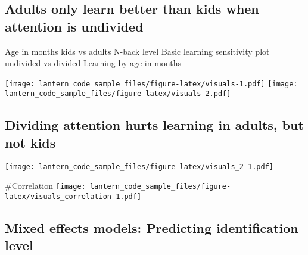 \documentclass[
]{article}
\newenvironment{Shaded}{\begin{snugshade}}{\end{snugshade}}
\newcommand{\AttributeTok}[1]{\textcolor[rgb]{0.77,0.63,0.00}{#1}}
\newcommand{\CommentTok}[1]{\textcolor[rgb]{0.56,0.35,0.01}{\textit{#1}}}
\newcommand{\DecValTok}[1]{\textcolor[rgb]{0.00,0.00,0.81}{#1}}
\newcommand{\FunctionTok}[1]{\textcolor[rgb]{0.00,0.00,0.00}{#1}}
\newcommand{\NormalTok}[1]{#1}
\newcommand{\OtherTok}[1]{\textcolor[rgb]{0.56,0.35,0.01}{#1}}
\newcommand{\SpecialCharTok}[1]{\textcolor[rgb]{0.00,0.00,0.00}{#1}}
\begin{document}
\begin{Shaded}
\end{Shaded}

\hypertarget{adults-only-learn-better-than-kids-when-attention-is-undivided}{%
\subsection{Adults only learn better than kids when attention is
undivided}\label{adults-only-learn-better-than-kids-when-attention-is-undivided}}

Age in months kids vs adults N-back level Basic learning sensitivity
plot undivided vs divided Learning by age in months

\texttt{[image: lantern\_code\_sample\_files/figure-latex/visuals-1.pdf]}
\texttt{[image: lantern\_code\_sample\_files/figure-latex/visuals-2.pdf]}

\hypertarget{dividing-attention-hurts-learning-in-adults-but-not-kids}{%
\subsection{Dividing attention hurts learning in adults, but not
kids}\label{dividing-attention-hurts-learning-in-adults-but-not-kids}}

\texttt{[image: lantern\_code\_sample\_files/figure-latex/visuals\_2-1.pdf]}

\#Correlation
\texttt{[image: lantern\_code\_sample\_files/figure-latex/visuals\_correlation-1.pdf]}

\hypertarget{mixed-effects-models-predicting-identification-level}{%
\subsection{Mixed effects models: Predicting identification
level}\label{mixed-effects-models-predicting-identification-level}}
\end{document}
